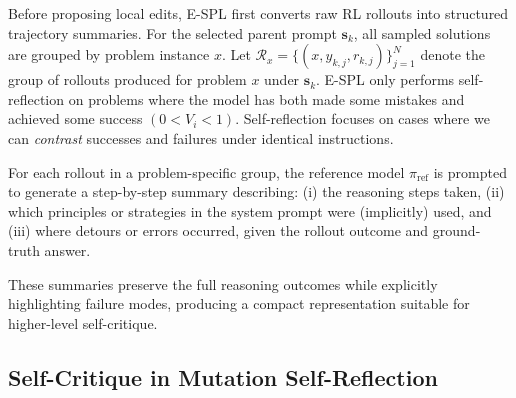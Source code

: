 \documentclass{article}
\theoremstyle{plain}
\theoremstyle{definition}
\theoremstyle{remark}
\begin{document}
Before proposing local edits, E-SPL first converts raw RL rollouts into structured trajectory summaries.  
For the selected parent prompt $\mathbf{s}_k$, all sampled solutions are grouped by problem instance $x$.  
Let $\mathcal{R}_x=\{(x,y_{k,j},r_{k,j})\}_{j=1}^{N}$ denote the group of rollouts produced for problem $x$ under $\mathbf{s}_k$. E-SPL only performs self-reflection on problems where the model has both made some mistakes and achieved some success $(0 < V_{i} < 1)$.
Self-reflection focuses on cases where we can \emph{contrast} successes and failures under identical instructions.

For each rollout in a problem-specific group, the reference model $\pi_{\text{ref}}$ is prompted to generate a step-by-step summary describing:
(i) the reasoning steps taken, 
(ii) which principles or strategies in the system prompt were (implicitly) used, and 
(iii) where detours or errors occurred, given the rollout outcome and ground-truth answer.  

These summaries preserve the full reasoning outcomes while explicitly highlighting failure modes, producing a compact representation suitable for higher-level self-critique.

\subsection{Self-Critique in Mutation Self-Reflection}
\label{sec:appendix-local-critique}
\end{document}
